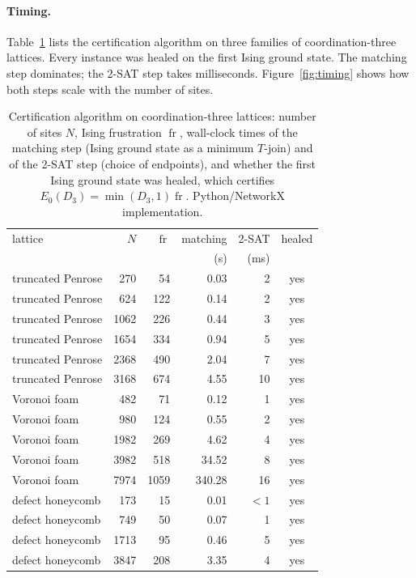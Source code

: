 \documentclass[aps,pre,twocolumn,superscriptaddress,showpacs]{revtex4-2}
\theoremstyle{definition}
\theoremstyle{remark}
\newcommand{\fr}{\operatorname{fr}}
\begin{document}
\paragraph*{Timing.} Table~\ref{tab:timing} lists the certification algorithm on three families of
coordination-three lattices. Every instance was healed on the first Ising ground state. The
matching step dominates; the 2-SAT step takes milliseconds. Figure~\ref{fig:timing} shows
how both steps scale with the number of sites.

\begin{table}
\caption{Certification algorithm on coordination-three lattices: number of sites $N$,
Ising frustration $\fr$, wall-clock times of the matching step (Ising ground state as a
minimum $T$-join) and of the 2-SAT step (choice of endpoints), and whether the first Ising
ground state was healed, which certifies $E_0(D_3)=\min(D_3,1)\fr$. Python/NetworkX implementation.}
\label{tab:timing}
\begin{ruledtabular}
\begin{tabular}{lrrrrc}
lattice & $N$ & $\fr$ & matching & 2-SAT & healed\\
 & & & (s) & (ms) & \\
\hline
truncated Penrose & 270 & 54 & 0.03 & 2 & yes\\
truncated Penrose & 624 & 122 & 0.14 & 2 & yes\\
truncated Penrose & 1062 & 226 & 0.44 & 3 & yes\\
truncated Penrose & 1654 & 334 & 0.94 & 5 & yes\\
truncated Penrose & 2368 & 490 & 2.04 & 7 & yes\\
truncated Penrose & 3168 & 674 & 4.55 & 10 & yes\\
Voronoi foam & 482 & 71 & 0.12 & 1 & yes\\
Voronoi foam & 980 & 124 & 0.55 & 2 & yes\\
Voronoi foam & 1982 & 269 & 4.62 & 4 & yes\\
Voronoi foam & 3982 & 518 & 34.52 & 8 & yes\\
Voronoi foam & 7974 & 1059 & 340.28 & 16 & yes\\
defect honeycomb & 173 & 15 & 0.01 & $<1$ & yes\\
defect honeycomb & 749 & 50 & 0.07 & 1 & yes\\
defect honeycomb & 1713 & 95 & 0.46 & 5 & yes\\
defect honeycomb & 3847 & 208 & 3.35 & 4 & yes\\
\end{tabular}
\end{ruledtabular}
\end{table}
\end{document}
